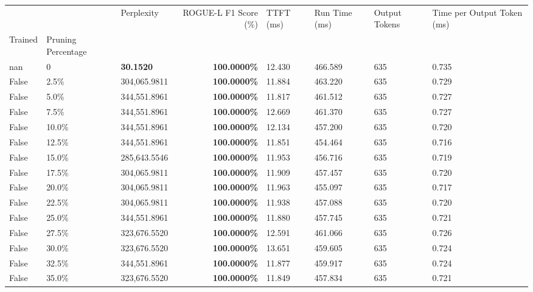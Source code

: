 \begin{table}[H]
\label{tab:evaluation-pipeline-9-untrained}
\begin{tabular}{lllrllll}
\toprule
 &  & Perplexity & ROGUE-L F1 Score (\%) & TTFT (ms) & Run Time (ms) & Output Tokens & Time per Output Token (ms) \\
Trained & Pruning Percentage &  &  &  &  &  &  \\
\midrule
nan & 0 & \bfseries 30.1520 & \bfseries 100.0000\% & 12.430 & 466.589 & 635 & 0.735 \\
\cline{1-8}
False & 2.5\% & 304,065.9811 & \bfseries \color{red} 100.0000\% & 11.884 & 463.220 & 635 & 0.729 \\
\cline{1-8}
False & 5.0\% & 344,551.8961 & \bfseries \color{red} 100.0000\% & 11.817 & 461.512 & 635 & 0.727 \\
\cline{1-8}
False & 7.5\% & 344,551.8961 & \bfseries \color{red} 100.0000\% & 12.669 & 461.370 & 635 & 0.727 \\
\cline{1-8}
False & 10.0\% & 344,551.8961 & \bfseries \color{red} 100.0000\% & 12.134 & 457.200 & 635 & 0.720 \\
\cline{1-8}
False & 12.5\% & 344,551.8961 & \bfseries \color{red} 100.0000\% & 11.851 & 454.464 & 635 & 0.716 \\
\cline{1-8}
False & 15.0\% & \color{red} 285,643.5546 & \bfseries \color{red} 100.0000\% & 11.953 & 456.716 & 635 & 0.719 \\
\cline{1-8}
False & 17.5\% & 304,065.9811 & \bfseries \color{red} 100.0000\% & 11.909 & 457.457 & 635 & 0.720 \\
\cline{1-8}
False & 20.0\% & 304,065.9811 & \bfseries \color{red} 100.0000\% & 11.963 & 455.097 & 635 & 0.717 \\
\cline{1-8}
False & 22.5\% & 304,065.9811 & \bfseries \color{red} 100.0000\% & 11.938 & 457.088 & 635 & 0.720 \\
\cline{1-8}
False & 25.0\% & 344,551.8961 & \bfseries \color{red} 100.0000\% & 11.880 & 457.745 & 635 & 0.721 \\
\cline{1-8}
False & 27.5\% & 323,676.5520 & \bfseries \color{red} 100.0000\% & 12.591 & 461.066 & 635 & 0.726 \\
\cline{1-8}
False & 30.0\% & 323,676.5520 & \bfseries \color{red} 100.0000\% & 13.651 & 459.605 & 635 & 0.724 \\
\cline{1-8}
False & 32.5\% & 344,551.8961 & \bfseries \color{red} 100.0000\% & 11.877 & 459.917 & 635 & 0.724 \\
\cline{1-8}
False & 35.0\% & 323,676.5520 & \bfseries \color{red} 100.0000\% & 11.849 & 457.834 & 635 & 0.721 \\

\end{tabular}
\end{table}
